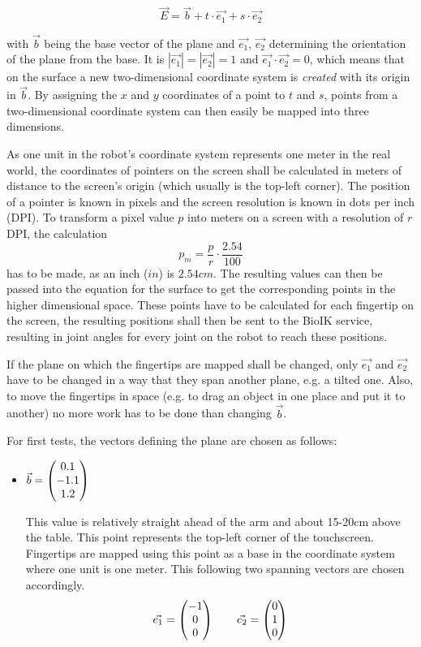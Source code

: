 \begin{equation*}
\vec{E} = \vec{b} + t\cdot \vec{e_1} + s \cdot \vec{e_2}
\end{equation*}

with $\vec{b}$ being the base vector of the plane and $\vec{e_1}$, $\vec{e_2}$ determining the orientation of the plane from the base. It is $|\vec{e_1}| = |\vec{e_2}| = 1$ and $\vec{e_1} \cdot \vec{e_2} = 0$, which means that on the surface a new two-dimensional coordinate system is \textit{created} with its origin in $\vec{b}$. By assigning the $x$ and $y$ coordinates of a point to $t$ and $s$, points from a two-dimensional coordinate system can then easily be mapped into three dimensions.

As one unit in the robot's coordinate system represents one meter in the real world, the coordinates of pointers on the screen shall be calculated in meters of distance to the screen's origin (which usually is the top-left corner). The position of a pointer is known in pixels and the screen resolution is known in dots per inch (DPI). To transform a pixel value $p$ into meters on a screen with a resolution of $r$ DPI, the calculation
\begin{equation*}
p_m = \frac{p}{r} \cdot \frac{2.54}{100}
\end{equation*}
has to be made, as an inch ($in$) is $2.54cm$. The resulting values can then be passed into the equation for the surface to get the corresponding points in the higher dimensional space. These points have to be calculated for each fingertip on the screen, the resulting positions shall then be sent to the BioIK service, resulting in joint angles for every joint on the robot to reach these positions.

If the plane on which the fingertips are mapped shall be changed, only $\vec{e_1}$ and $\vec{e_2}$ have to be changed in a way that they span another plane, e.g. a tilted one.  Also, to move the fingertips in space (e.g. to drag an object in one place and put it to another) no more work has to be done than changing $\vec{b}$. 

For first tests, the vectors defining the plane are chosen as follows:
\begin{itemize}
	\item $\vec{b} = \left( \begin{matrix} 0.1 \\ -1.1 \\ 1.2 \end{matrix} \right)$
	
	This value is relatively straight ahead of the arm and about 15-20cm above the table. This point represents the top-left corner of the touchscreen. Fingertips are mapped using this point as a base in the coordinate system where one unit is one meter. This following two spanning vectors are chosen accordingly.
	\begin{equation*}
	 \vec{e_1} = \left( \begin{matrix} -1 \\ 0 \\ 0 \end{matrix} \right) \qquad
	\vec{e_2} = \left( \begin{matrix} 0 \\ 1 \\ 0 \end{matrix} \right)
	\end{equation*}
	
\end{itemize}


